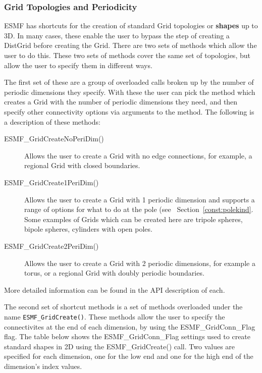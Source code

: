 \subsubsection{Grid Topologies and Periodicity}
\label{sec:ShapeShortcut}
\begin{sloppypar}
ESMF has shortcuts for the creation of standard Grid topologies 
or {\bf shapes} up to 3D.  In many cases, these enable the user to
bypass the step of creating a DistGrid before creating the Grid. 
There are two sets of methods which allow the user to do this. These two sets of methods cover the same set of topologies, but
allow the user to specify them in different ways.

 The first set of these are a group of overloaded
calls broken up by the number of periodic dimensions they specify. With these the user can pick 
the method which creates a Grid with the number of periodic dimensions they need, and then specify other connectivity 
options via arguments to the method. The following is a description of these methods:  
\end{sloppypar}

\medskip

\begin{description}
\item [ESMF\_GridCreateNoPeriDim()] Allows the user to create a Grid with no edge connections, for example, a regional Grid with closed boundaries.

\item [ESMF\_GridCreate1PeriDim()] Allows the user to create a Grid with 1 periodic dimension and supports a range of options for what to do at the pole (see ~Section~\ref{const:polekind}. Some examples of Grids which can be created here are tripole spheres, bipole spheres, cylinders with open poles. 

\item [ESMF\_GridCreate2PeriDim()] Allows the user to create a Grid with 2 periodic dimensions, for example a torus, or a regional Grid with
doubly periodic boundaries. 
\end{description}

More detailed information can be found in the API description of each.

\medskip

\begin{sloppypar}
The second set of shortcut methods is a set of methods overloaded under the name {\tt ESMF\_GridCreate()}. These methods
allow the user to specify the connectivites at the end of each dimension, by using the ESMF\_GridConn\_Flag flag. The table below shows the ESMF\_GridConn\_Flag settings used to create 
standard shapes in 2D using the ESMF\_GridCreate() call.  Two values
are specified for each dimension, one for the low end and one for 
the high end of the dimension's index values. 
\end{sloppypar}

